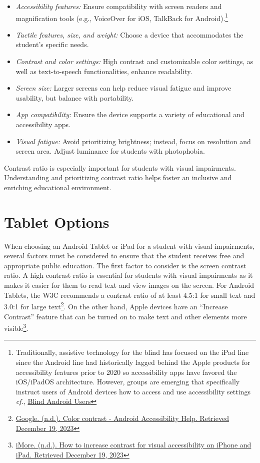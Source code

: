 \begin{itemize}
    \item \emph{Accessibility features:} Ensure compatibility with screen readers and magnification tools (e.g., VoiceOver for iOS, TalkBack for Android).\footnote{Traditionally, assistive technology for the blind has focused on the iPad line since the Android line had historically lagged behind the Apple products for accessibility features prior to 2020 so accessibility apps have favored the iOS/iPadOS architecture. However, groups are emerging that specifically instruct users of Android devices how to access and use accessibility settings \emph{cf.}, \href{http://www.youtube.com/channel/UCvEM-SmpwElNALldhp8hG1g}{Blind Android Users}}
    \item \emph{Tactile features, size, and weight:} Choose a device that accommodates the student's specific needs.
    \item \emph{Contrast and color settings:} High contrast and customizable color settings, as well as text-to-speech functionalities, enhance readability.
    \item \emph{Screen size:} Larger screens can help reduce visual fatigue and improve usability, but balance with portability.
    \item \emph{App compatibility:} Ensure the device supports a variety of educational and accessibility apps.
    \item \emph{Visual fatigue:} Avoid prioritizing brightness; instead, focus on resolution and screen area. Adjust luminance for students with photophobia.
\end{itemize}

Contrast ratio is especially important for students with visual impairments. Understanding and prioritizing contrast ratio helps foster an inclusive and enriching educational environment.

\section{Tablet Options}\label{tab:tablet-options}
When choosing an Android Tablet or iPad for a student with visual impairments, several factors must be considered to ensure that the student receives free and appropriate public education. The first factor to consider is the screen contrast ratio. A high contrast ratio is essential for students with visual impairments as it makes it easier for them to read text and view images on the screen. For Android Tablets, the W3C recommends a contrast ratio of at least 4.5:1 for small text and 3.0:1 for large text\footnote{\raggedright \href{https://support.google.com/accessibility/android/answer/7158390?hl=en}{Google. (n.d.). Color contrast - Android Accessibility Help. Retrieved December 19, 2023}}. On the other hand, Apple devices have an “Increase Contrast” feature that can be turned on to make text and other elements more visible\footnote{\raggedright \href{https://www.imore.com/how-increase-contrast-visual-accessibility-iphone-and-ipad}{iMore. (n.d.). How to increase contrast for visual accessibility on iPhone and iPad. Retrieved December 19, 2023}}.

